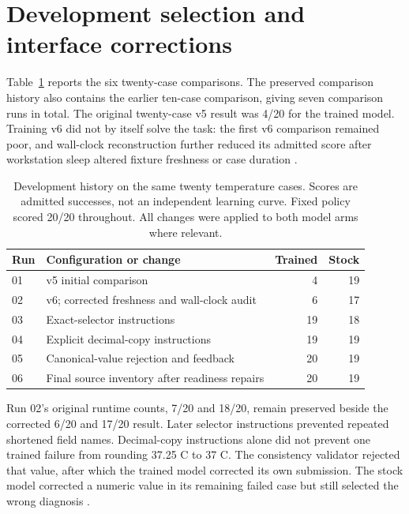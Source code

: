 \documentclass[11pt,letterpaper]{article}
\begin{document}
\appendix
\section{Development selection and interface corrections}
\label{app:development}

Table~\ref{tab:modelhistory} reports the six twenty-case comparisons. The
preserved comparison history also contains the earlier ten-case comparison,
giving seven comparison runs in total. The original twenty-case v5 result
was 4/20 for the trained model. Training v6 did not by itself solve the task:
the first v6 comparison remained poor, and wall-clock reconstruction further
reduced its admitted score after workstation sleep altered fixture freshness
or case duration \cite{comparisons,reduced}.

\begin{table}[htbp]
\centering\small
\caption{Development history on the same twenty temperature cases. Scores
are admitted successes, not an independent learning curve. Fixed policy scored
20/20 throughout. All changes were applied to both model arms where relevant.}
\label{tab:modelhistory}
\begin{tabular}{@{}lp{}rr@{}}
\toprule
Run & Configuration or change & Trained & Stock\\
\midrule
01 & v5 initial comparison & 4 & 19\\
02 & v6; corrected freshness and wall-clock audit & 6 & 17\\
03 & Exact-selector instructions & 19 & 18\\
04 & Explicit decimal-copy instructions & 19 & 19\\
05 & Canonical-value rejection and feedback & 20 & 19\\
06 & Final source inventory after readiness repairs & 20 & 19\\
\bottomrule
\end{tabular}
\end{table}

Run 02's original runtime counts, 7/20 and 18/20, remain preserved beside the
corrected 6/20 and 17/20 result. Later selector instructions prevented repeated
shortened field names. Decimal-copy instructions alone did not prevent one
trained failure from rounding 37.25 C to 37 C. The consistency validator rejected
that value, after which the trained model corrected its own submission.
The stock model corrected a numeric value in its remaining failed case but
still selected the wrong diagnosis \cite{comparisons,reduced}.
\end{document}
